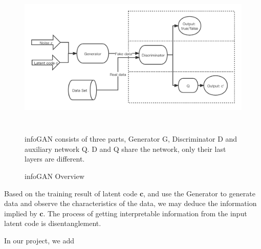 \begin{figure}[h]
  \centering
  \includegraphics[width=\textwidth, height = 7cm]{figures/infoGAN.png}
  \caption{infoGAN Overview}{infoGAN consists of three parts, Generator G, Discriminator D and auxiliary network Q. D and Q share the network, only their last layers are different.}
  \label{infoGan}
\end{figure}

Based on the training result of latent code \(\mathbf{c}\), and use the Generator to generate data and observe the characteristics of the data, we may deduce the information implied by \(\mathbf{c}\). The process of getting interpretable information from the input latent code is disentanglement.

In our project, we add